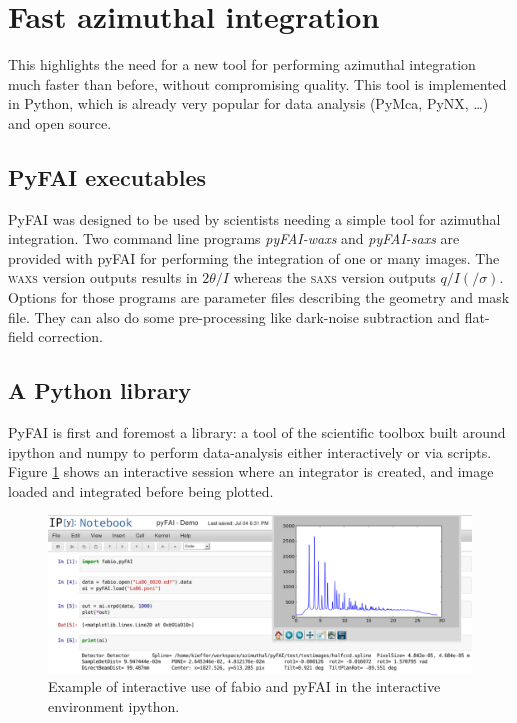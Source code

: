 \documentclass[a4paper]{jpconf}
\begin{document}
\section{Fast azimuthal integration}
This highlights the need for a new tool for performing azimuthal integration
much faster than before, without compromising quality. This tool is
implemented in Python, which is already very popular for data
analysis (PyMca\cite{pymca}, PyNX\cite{pynx}, \ldots) and open source.

\subsection{PyFAI executables}
PyFAI was designed to be used by scientists needing a simple tool for azimuthal
integration. Two command line programs \textit{pyFAI-waxs} and
\textit{pyFAI-saxs} are provided with pyFAI for performing the
integration of one or many images. The \textsc{waxs} version outputs results in
$2\theta /I$  whereas the \textsc{saxs} version outputs $q/I(/\sigma )$.
Options for those programs are parameter files describing the geometry and mask file. They can
also do some  pre-processing like dark-noise subtraction and flat-field correction.

\subsection{A Python library}
PyFAI is first and foremost a library: a tool of the scientific
toolbox built around ipython\cite{ipython} and numpy\cite{numpy} to
perform data-analysis either interactively or via scripts.
Figure \ref{notebook} shows an interactive session where an integrator is
created, and image loaded and integrated before being plotted.

\begin{figure}[h]
\begin{center}
\includegraphics[width=15cm]{img/notebook-l.eps}
\caption{\label{notebook} Example of interactive use of fabio and pyFAI in the
interactive environment ipython.}
\end{center}
\end{figure}
\end{document}

